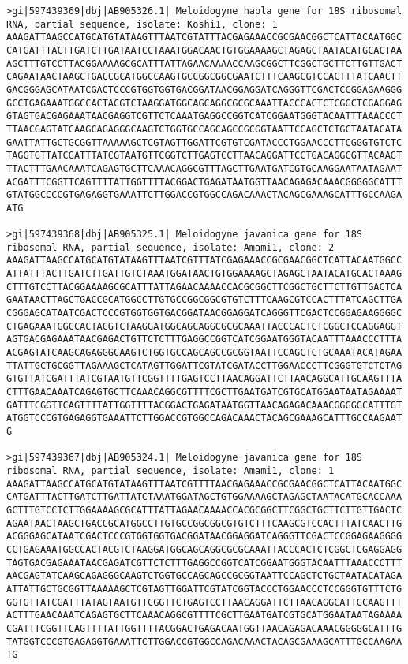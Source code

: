 \documentclass[11pt]{article}
\begin{document}
\begin{Verbatim}[commandchars=\\\{\}]
>gi|597439369|dbj|AB905326.1| Meloidogyne hapla gene for 18S ribosomal RNA, partial sequence, isolate: Koshi1, clone: 1
AAAGATTAAGCCATGCATGTATAAGTTTAATCGTATTTACGAGAAACCGCGAACGGCTCATTACAATGGC
CATGATTTACTTGATCTTGATAATCCTAAATGGACAACTGTGGAAAAGCTAGAGCTAATACATGCACTAA
AGCTTTGTCCTTACGGAAAAGCGCATTTATTAGAACAAAACCAAGCGGCTTCGGCTGCTTCTTGTTGACT
CAGAATAACTAAGCTGACCGCATGGCCAAGTGCCGGCGGCGAATCTTTCAAGCGTCCACTTTATCAACTT
GACGGGAGCATAATCGACTCCCGTGGTGGTGACGGATAACGGAGGATCAGGGTTCGACTCCGGAGAAGGG
GCCTGAGAAATGGCCACTACGTCTAAGGATGGCAGCAGGCGCGCAAATTACCCACTCTCGGCTCGAGGAG
GTAGTGACGAGAAATAACGAGGTCGTTCTCAAATGAGGCCGGTCATCGGAATGGGTACAATTTAAACCCT
TTAACGAGTATCAAGCAGAGGGCAAGTCTGGTGCCAGCAGCCGCGGTAATTCCAGCTCTGCTAATACATA
GAATTATTGCTGCGGTTAAAAAGCTCGTAGTTGGATTCGTGTCGATACCCTGGAACCCTTCGGGTGTCTC
TAGGTGTTATCGATTTATCGTAATGTTCGGTCTTGAGTCCTTAACAGGATTCCTGACAGGCGTTACAAGT
TTACTTTGAACAAATCAGAGTGCTTCAAACAGGCGTTTAGCTTGAATGATCGTGCAAGGAATAATAGAAT
ACGATTTCGGTTCAGTTTTATTGGTTTTACGGACTGAGATAATGGTTAACAGAGACAAACGGGGGCATTT
GTATGGCCCCGTGAGAGGTGAAATTCTTGGACCGTGGCCAGACAAACTACAGCGAAAGCATTTGCCAAGA
ATG

>gi|597439368|dbj|AB905325.1| Meloidogyne javanica gene for 18S ribosomal RNA, partial sequence, isolate: Amami1, clone: 2
AAAGATTAAGCCATGCATGTATAAGTTTAATCGTTTATCGAGAAACCGCGAACGGCTCATTACAATGGCC
ATTATTTACTTGATCTTGATTGTCTAAATGGATAACTGTGGAAAAGCTAGAGCTAATACATGCACTAAAG
CTTTGTCCTTACGGAAAAGCGCATTTATTAGAACAAAACCACGCGGCTTCGGCTGCTTCTTGTTGACTCA
GAATAACTTAGCTGACCGCATGGCCTTGTGCCGGCGGCGTGTCTTTCAAGCGTCCACTTTATCAGCTTGA
CGGGAGCATAATCGACTCCCGTGGTGGTGACGGATAACGGAGGATCAGGGTTCGACTCCGGAGAAGGGGC
CTGAGAAATGGCCACTACGTCTAAGGATGGCAGCAGGCGCGCAAATTACCCACTCTCGGCTCCAGGAGGT
AGTGACGAGAAATAACGAGACTGTTCTCTTTGAGGCCGGTCATCGGAATGGGTACAATTTAAACCCTTTA
ACGAGTATCAAGCAGAGGGCAAGTCTGGTGCCAGCAGCCGCGGTAATTCCAGCTCTGCAAATACATAGAA
TTATTGCTGCGGTTAGAAAGCTCATAGTTGGATTCGTATCGATACCTTGGAACCCTTCGGGTGTCTCTAG
GTGTTATCGATTTATCGTAATGTTCGGTTTTGAGTCCTTAACAGGATTCTTAACAGGCATTGCAAGTTTA
CTTTGAACAAATCAGAGTGCTTCAAACAGGCGTTTTCGCTTGAATGATCGTGCATGGAATAATAGAAAAT
GATTTCGGTTCAGTTTTATTGGTTTTACGGACTGAGATAATGGTTAACAGAGACAAACGGGGGCATTTGT
ATGGTCCCGTGAGAGGTGAAATTCTTGGACCGTGGCCAGACAAACTACAGCGAAAGCATTTGCCAAGAAT
G

>gi|597439367|dbj|AB905324.1| Meloidogyne javanica gene for 18S ribosomal RNA, partial sequence, isolate: Amami1, clone: 1
AAAGATTAAGCCATGCATGTATAAGTTTAATCGTTTTAACGAGAAACCGCGAACGGCTCATTACAATGGC
CATGATTTACTTGATCTTGATTATCTAAATGGATAGCTGTGGAAAAGCTAGAGCTAATACATGCACCAAA
GCTTTGTCCTCTTGGAAAAGCGCATTTATTAGAACAAAACCACGCGGCTTCGGCTGCTTCTTGTTGACTC
AGAATAACTAAGCTGACCGCATGGCCTTGTGCCGGCGGCGTGTCTTTCAAGCGTCCACTTTATCAACTTG
ACGGGAGCATAATCGACTCCCGTGGTGGTGACGGATAACGGAGGATCAGGGTTCGACTCCGGAGAAGGGG
CCTGAGAAATGGCCACTACGTCTAAGGATGGCAGCAGGCGCGCAAATTACCCACTCTCGGCTCGAGGAGG
TAGTGACGAGAAATAACGAGATCGTTCTCTTTGAGGCCGGTCATCGGAATGGGTACAATTTAAACCCTTT
AACGAGTATCAAGCAGAGGGCAAGTCTGGTGCCAGCAGCCGCGGTAATTCCAGCTCTGCTAATACATAGA
ATTATTGCTGCGGTTAAAAAGCTCGTAGTTGGATTCGTATCGGTACCCTGGAACCCTCCGGGTGTTTCTG
GGTGTTATCGATTTATAGTAATGTTCGGTTCTGAGTCCTTAACAGGATTCTTAACAGGCATTGCAAGTTT
ACTTTGAACAAATCAGAGTGCTTCAAACAGGCGTTTTCGCTTGAATGATCGTGCATGGAATAATAGAAAA
CGATTTCGGTTCAGTTTTATTGGTTTTACGGACTGAGACAATGGTTAACAGAGACAAACGGGGGCATTTG
TATGGTCCCGTGAGAGGTGAAATTCTTGGACCGTGGCCAGACAAACTACAGCGAAAGCATTTGCCAAGAA
TG


\end{Verbatim}
\end{document}
